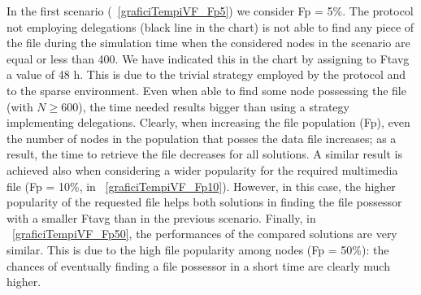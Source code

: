 In the first scenario (\figurename~\ref{graficiTempiVF_Fp5}) we consider Fp = 5\%. The protocol not employing delegations (black line in the chart) is not able to find any piece of the file during the simulation time when the considered nodes in the scenario are equal or less than 400. We have indicated this in the chart by assigning to Ftavg a value of 48 h. This is due to the trivial strategy employed by the protocol and to the sparse environment. Even when able to find some node possessing the file (with $N \geq 600$), the time needed results bigger than using a strategy implementing delegations. Clearly, when increasing the file population (Fp), even the number of nodes in the population that posses the data file increases; as a result, the time to retrieve the file decreases for all solutions. A similar result is achieved also when considering a wider popularity for the required multimedia file (Fp = 10\%, in \figurename~\ref{graficiTempiVF_Fp10}). However, in this case, the higher popularity of the requested file helps both solutions in finding the file possessor with a smaller Ftavg than in the previous scenario.  Finally, in \figurename~\ref{graficiTempiVF_Fp50}, the performances of the compared solutions are very similar. This is due to the high file popularity among nodes (Fp = 50\%): the chances of eventually finding a file possessor in a short time are clearly much higher.



